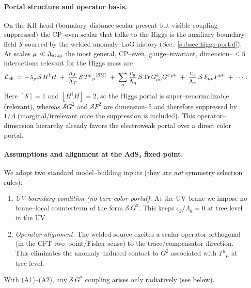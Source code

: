 \documentclass[10pt]{article}
\theoremstyle{definition}
\theoremstyle{plain}
\begin{document}
\paragraph{Portal structure and operator basis.}\label{par:uom-main-131}
On the KR head (boundary--distance scalar present but visible coupling suppressed) the CP--even scalar
that talks to the Higgs is the auxiliary boundary field $\mathcal S$ sourced by the welded anomaly--LoG
history (Sec.~\ref{subsec:higgs-portal}). At scales $\mu\ll \Lambda_{\rm stop}$ the most general, CP--even,
gauge--invariant, dimension--$\le 5$ interactions relevant for the Higgs mass are
\begin{equation}
\mathcal L_{\rm eff}
\,=\,
-\lambda_p\,\mathcal S\,H^\dagger H
\;+\; \frac{\kappa_T}{\Lambda_T}\,\mathcal S\,T^\mu{}_\mu{}^{\rm (SM)}
\;+\; \sum_{a}\frac{c_{g}}{\Lambda_g}\,\mathcal S\,\mathrm{Tr}\,G_{\mu\nu}^a G^{a\,\mu\nu}
\;+\; \frac{c_{\gamma}}{\Lambda_\gamma}\,\mathcal S\,F_{\mu\nu}F^{\mu\nu}
\;+\;\cdots.
\label{eq:Seff-ops}
\end{equation}
Here $[\mathcal S]=1$ and $[H^\dagger H]=2$, so the Higgs portal is super–renormalizable (relevant), whereas $\mathcal S G^2$ and $\mathcal S F^2$ are dimension–5 and therefore suppressed by $1/\Lambda$ (marginal/irrelevant once the suppression is included). This operator–dimension hierarchy already favors the electroweak portal over a direct color portal.

\paragraph{Assumptions and alignment at the AdS$_4$ fixed point.}\label{par:uom-main-132}
We adopt two standard model–building inputs (they are \emph{not} symmetry selection rules):
\begin{enumerate}[label=(A\arabic*),leftmargin=2.1em,itemsep=2pt]
\item \emph{UV boundary condition (no bare color portal).} At the UV brane we impose no brane–local counterterm of the form $\mathcal S\,G^2$. This keeps $c_g/\Lambda_g=0$ at tree level in the UV.
\item \emph{Operator alignment.} The welded source excites a scalar operator orthogonal (in the CFT two–point/Fisher sense) to the trace/compensator direction. This eliminates the anomaly–induced contact to $G^2$ associated with $T^\mu{}_\mu$ at tree level. 
\end{enumerate}
With (A1)–(A2), any $\mathcal S\,G^2$ coupling arises only radiatively (see below).
\end{document}
